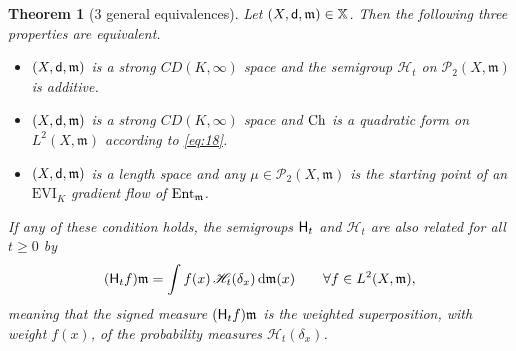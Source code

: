 \documentclass[reqno,11pt]{article}
\numberwithin{equation}{section}
\newcommand{\C}{\mathbb{C}}
\newcommand{\mm}{{\mbox{\boldmath$m$}}}
\newcommand{\sfd}{{\sf d}}
\renewcommand{\d}{{\mathrm d}}
\newcommand{\EVI}[4]{\mathrm{EVI}_{#4}(#1,{#2}_W,#3)}
\newcommand{\ProbabilitiesTwo}[1]{\mathscr P_2(#1)}     %
\newtheorem{theorem}{Theorem}[section]
\newcommand{\entv}{{\rm Ent}_{\mm}}                    %
\newcommand{\probt}{\ProbabilitiesTwo}
\newcommand{\X}{\mathbb X}
\renewcommand{\C}{{\rm Ch}}
\newcommand{\heatl}{{\sf H}}
\newcommand{\heatw}{{\mathscr H}}
\renewcommand{\EVI}{\ensuremath{\mathrm{EVI}}}
\renewcommand{\mm}{\mathfrak m}
\begin{document}
\begin{theorem}[3 general equivalences]\label{thm:mainriem}
Let $(X,\sfd,\mm)\in\X$. Then the following three properties are
equivalent.
\begin{itemize}
\item[(i)] $(X,\sfd,\mm)$ is a strong $CD(K,\infty)$ space and the semigroup $\heatw_t$ on $\probt {X,\mm}$
is additive.
\item[(ii)] $(X,\sfd,\mm)$  is a strong $CD(K,\infty)$ space and $\C$
  is a quadratic form on $L^2(X,\mm)$ according to \eqref{eq:18}.
\item[(iii)] $(X,\sfd,\mm)$ is a length space and any $\mu\in\probt {X,\mm}$ is the
starting point of an $\EVI_K$ gradient flow of $\entv$.
\end{itemize}
If any of these condition holds, the semigroups $\heatl_t$ and
$\heatw_t$ are also related for all $t\geq 0$ by
\begin{equation}\label{eq:heatlheatw}
(\heatl_t f)\mm=\int f(x)\,\heatw_t(\delta_x)\,\d\mm(x)
\qquad\forall f\in L^2(X,\mm),
\end{equation}
meaning that the signed measure $(\heatl_tf)\mm$ is the weighted
superposition, with weight $f(x)$, of the probability measures
$\heatw_t(\delta_x)$.
\end{theorem}
\end{document}
